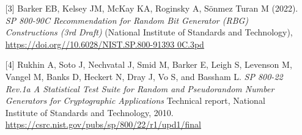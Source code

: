 \begin{talk}
\begin{enumerate}
\item[{[3]}] Barker EB, Kelsey JM, McKay KA, Roginsky A, S\"{o}nmez Turan M (2022). {\it SP 800-90C Recommendation for Random Bit Generator (RBG) Constructions (3rd Draft)} (National Institute of Standards and Technology), \url{https://doi.org//10.6028/NIST.SP.800-91393
0C.3pd}

\item[{[4]}] Rukhin A, Soto J, Nechvatal J, Smid M, Barker E, 
Leigh S, Levenson M, Vangel M, Banks D, Heckert N, Dray J, Vo S,  and Bassham L. {\it SP 800-22 Rev.1a A Statistical Test Suite for Random and Pseudorandom Number Generators for Cryptographic Applications} Technical report, National Institute of Standards and Technology, 2010. \url{https://csrc.nist.gov/pubs/sp/800/22/r1/upd1/final}
\end{enumerate}

\end{talk}

